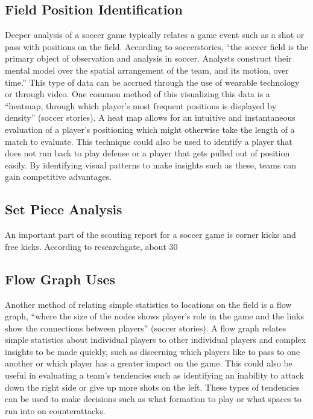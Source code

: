 \documentclass[sigconf]{acmart}
\begin{document}
\subsection{Field Position Identification}Deeper analysis of a soccer game typically relates a game event such as a shot or pass with positions on the field. According to soccerstories, “the soccer field is the primary object of observation and analysis in soccer. Analysts construct their mental model over the spatial arrangement of the team, and its motion, over time.” This type of data can be accrued through the use of wearable technology or through video. One common method of this visualizing this data is a “heatmap, through which player's most frequent positions is displayed by density” (soccer stories). A heat map allows for an intuitive and instantaneous evaluation of a player’s positioning which might otherwise take the length of a match to evaluate. This technique could also be used to identify a player that does not run back to play defense or a player that gets pulled out of position easily. By identifying visual patterns to make insights such as these, teams can gain competitive advantages.
\subsection{Set Piece Analysis}An important part of the scouting report for a soccer game is corner kicks and free kicks. According to researchgate,  about 30%
\subsection{Flow Graph Uses}Another method of relating simple statistics to locations on the field is a flow graph, “where the size of the nodes shows player's role in the game and the links show the connections between players” (soccer stories). A flow graph relates simple statistics about individual players to other individual players and complex insights to be made quickly, such as discerning which players like to pass to one another or which player has a greater impact on the game. This could also be useful in evaluating a team’s tendencies such as identifying an inability to attack down the right side or give up more shots on the left. These types of tendencies can be used to make decisions such as what formation to play or what spaces to run into on counterattacks.
\end{document}
